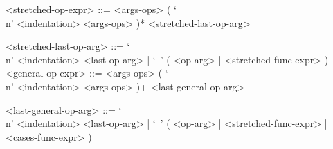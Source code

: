 \documentclass{article}
\begin{document}
\begin{itemize}
\begin{grammar}
<stretched-op-expr> ::=
<args-ops> ( `\\n' <indentation> <args-ops> )* <stretched-last-op-arg>

<stretched-last-op-arg> ::= 
`\\n' <indentation> <last-op-arg> | `\ ' ( <op-arg> | <stretched-func-expr> )\\

<general-op-expr> ::=
<args-ops> ( `\\n' <indentation> <args-ops> )+ <last-general-op-arg>

<last-general-op-arg> ::= 
`\\n' <indentation> <last-op-arg> |
`\ ' ( <op-arg> | <stretched-func-expr> | <cases-func-expr> )
\end{grammar}
\end{itemize}
\end{document}
